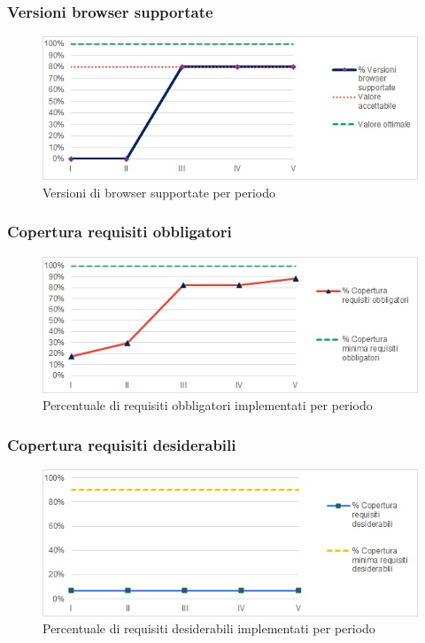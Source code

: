 \subsubsection{Versioni browser supportate}
\begin{figure}[H]
  \centering
  \includegraphics[scale=0.8]{immagini/browser.jpg}
  \caption{Versioni di browser supportate per periodo}
\end{figure}

\subsubsection{Copertura requisiti obbligatori}
\begin{figure}[H]
  \centering
  \includegraphics[scale=0.8]{immagini/cop_obbligatori.jpg}
  \caption{Percentuale di requisiti obbligatori implementati per periodo}
\end{figure}

\subsubsection{Copertura requisiti desiderabili}
\begin{figure}[H]
  \centering
  \includegraphics[scale=0.8]{immagini/cop_desiderabili.jpg}
  \caption{Percentuale di requisiti desiderabili implementati per periodo}
\end{figure}

